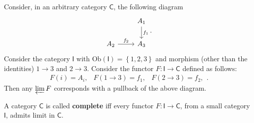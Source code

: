 \begin{ex}
	Consider, in an arbitrary category $\mathsf{C}$, the following diagram
	\begin{equation}
	\begin{tikzcd}
		& A_1 \arrow[d, "f_1", rightarrow] \\
		A_2 \arrow[r, "f_2", rightarrow] &
		A_3
	\end{tikzcd}
	.\end{equation} 
	Consider the category $\mathsf{I}$ with $\mathrm{Ob} \left(\mathsf{I}\right) = \left\{ 1, 2, 3 \right\}$ and morphism (other than the identities) $1 \to 3$ and $2 \to 3$.
	Consider the functor $F: \mathsf{I} \to \mathsf{C}$ defined as follows:
	 \begin{equation}
		 \begin{matrix}
			 F(i) = A_i, &
			 F( 1 \to 3) = f_1, &
			 F( 2 \to 3) = f_2,
		 \end{matrix} 
	.\end{equation} 
	Then any $\varprojlim F$ corresponds with a pullback of the above diagram.
\end{ex} 

\begin{defn}
	A category $\mathsf{C}$ is called \textbf{complete} iff 
	every functor $F: \mathsf{I} \to \mathsf{C}$, from a small category $\mathsf{I}$, admits limit in $\mathsf{C}$.
\end{defn}

